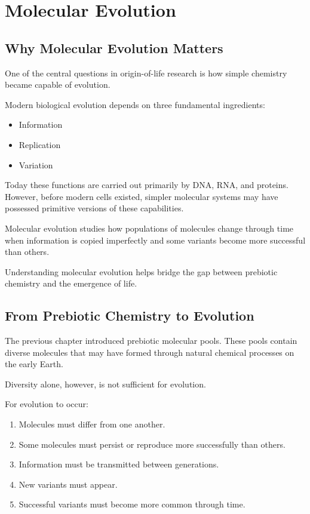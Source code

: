 \documentclass[
  oneside,
  openany]{book}
\providecommand{\tightlist}{%
  \setlength{\itemsep}{0pt}\setlength{\parskip}{0pt}}
\begin{document}
\chapter{Molecular Evolution}\label{molecular-evolution}

\section{Why Molecular Evolution Matters}\label{why-molecular-evolution-matters}

One of the central questions in origin-of-life research is how simple chemistry became capable of evolution.

Modern biological evolution depends on three fundamental ingredients:

\begin{itemize}
\tightlist
\item
  Information
\item
  Replication
\item
  Variation
\end{itemize}

Today these functions are carried out primarily by DNA, RNA, and proteins. However, before modern cells existed, simpler molecular systems may have possessed primitive versions of these capabilities.

Molecular evolution studies how populations of molecules change through time when information is copied imperfectly and some variants become more successful than others.

Understanding molecular evolution helps bridge the gap between prebiotic chemistry and the emergence of life.

\section{From Prebiotic Chemistry to Evolution}\label{from-prebiotic-chemistry-to-evolution}

The previous chapter introduced prebiotic molecular pools. These pools contain diverse molecules that may have formed through natural chemical processes on the early Earth.

Diversity alone, however, is not sufficient for evolution.

For evolution to occur:

\begin{enumerate}
\def\labelenumi{\arabic{enumi}.}
\tightlist
\item
  Molecules must differ from one another.
\item
  Some molecules must persist or reproduce more successfully than others.
\item
  Information must be transmitted between generations.
\item
  New variants must appear.
\item
  Successful variants must become more common through time.
\end{enumerate}
\end{document}
